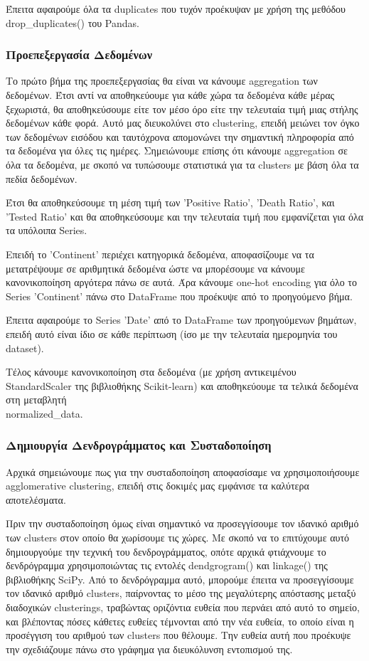 \documentclass[12pt,a4paper]{article}
\begin{document}
Έπειτα αφαιρούμε όλα τα duplicates που τυχόν προέκυψαν με χρήση της μεθόδου drop\_duplicates() του Pandas.

\subsubsection{Προεπεξεργασία Δεδομένων}

Το πρώτο βήμα της προεπεξεργασίας θα είναι να κάνουμε aggregation των δεδομένων. Έτσι αντί να αποθηκεύουμε για κάθε χώρα τα δεδομένα κάθε μέρας ξεχωριστά, θα αποθηκεύσουμε είτε τον μέσο όρο είτε την τελευταία τιμή μιας στήλης δεδομένων κάθε φορά. Αυτό μας διευκολύνει στο clustering, επειδή μειώνει τον όγκο των δεδομένων εισόδου και ταυτόχρονα απομονώνει την σημαντική πληροφορία από τα δεδομένα για όλες τις ημέρες. Σημειώνουμε επίσης ότι κάνουμε aggregation σε όλα τα δεδομένα, με σκοπό να τυπώσουμε στατιστικά για τα clusters με βάση όλα τα πεδία δεδομένων.

Έτσι θα αποθηκεύσουμε τη μέση τιμή των 'Positive Ratio', 'Death Ratio', και 'Tested Ratio' και θα αποθηκεύσουμε και την τελευταία τιμή που εμφανίζεται για όλα τα υπόλοιπα Series.

Επειδή το 'Continent' περιέχει κατηγορικά δεδομένα, αποφασίζουμε να τα μετατρέψουμε σε αριθμητικά δεδομένα ώστε να μπορέσουμε να κάνουμε κανονικοποίηση αργότερα πάνω σε αυτά. Άρα κάνουμε one-hot encoding για όλο το Series 'Continent' πάνω στο DataFrame που προέκυψε από το προηγούμενο βήμα.

Έπειτα αφαιρούμε το Series 'Date' από το DataFrame των προηγούμενων βημάτων, επειδή αυτό είναι ίδιο σε κάθε περίπτωση (ίσο με την τελευταία ημερομηνία του dataset).

Τέλος κάνουμε κανονικοποίηση στα δεδομένα (με χρήση αντικειμένου StandardScaler της βιβλιοθήκης Scikit-learn) και αποθηκεύουμε τα τελικά δεδομένα στη μεταβλητή \\normalized\_data.

\subsubsection{Δημιουργία Δενδρογράμματος και Συσταδοποίηση}

Αρχικά σημειώνουμε πως για την συσταδοποίηση αποφασίσαμε να χρησιμοποιήσουμε agglomerative clustering, επειδή στις δοκιμές μας εμφάνισε τα καλύτερα αποτελέσματα.

Πριν την συσταδοποίηση όμως είναι σημαντικό να προσεγγίσουμε τον ιδανικό αριθμό των clusters στον οποίο θα χωρίσουμε τις χώρες. Με σκοπό να το επιτύχουμε αυτό δημιουργούμε την τεχνική του δενδρογράμματος, οπότε αρχικά φτιάχνουμε το δενδρόγραμμα χρησιμοποιώντας τις εντολές dendgrogram() και linkage() της βιβλιοθήκης SciPy. Από το δενδρόγραμμα αυτό, μπορούμε έπειτα να προσεγγίσουμε τον ιδανικό αριθμό clusters, παίρνοντας το μέσο της μεγαλύτερης απόστασης μεταξύ διαδοχικών clusterings, τραβώντας οριζόντια ευθεία που περνάει από αυτό το σημείο, και βλέποντας πόσες κάθετες ευθείες τέμνονται από την νέα ευθεία, το οποίο είναι η προσέγγιση του αριθμού των clusters που θέλουμε. Την ευθεία αυτή που προέκυψε την σχεδιάζουμε πάνω στο γράφημα για διευκόλυνση εντοπισμού της.
\end{document}
